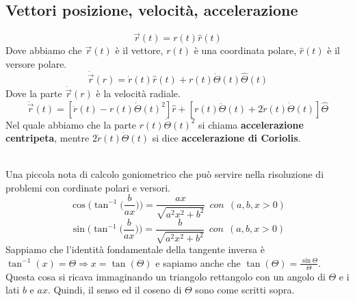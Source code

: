 \subsection*{Vettori posizione, velocità, accelerazione}
$$\vec{r}(t) = r(t)\hat{r}(t)$$
Dove abbiamo che $\vec{r}(t)$ è il vettore, $r(t)$ è una coordinata polare, $\hat{r}(t)$ è il versore polare.
$$\dot{\vec{r}}(r) = \dot{r}(t)\hat{r}(t) + r(t)\dot{\Theta}(t)\hat{\Theta}(t)$$
Dove la parte $\dot{\vec{r}}(r)$ è la velocità radiale.
$$\ddot{\vec{r}}(t) = [\ddot{r}(t) - r(t)\dot{\Theta}(t)^2] \hat{r} + [r(t) \ddot{\Theta}(t) + 2\dot{r}(t)\dot{\Theta}(t)]\hat{\Theta}$$
Nel quale abbiamo che la parte $r(t)\dot{\Theta}(t)^2$ si chiama \textbf{accelerazione centripeta}, mentre $2\dot{r}(t)\dot{\Theta}(t)$ si dice \textbf{accelerazione di Coriolis}.
\\\\
\begin{note}
    Una piccola nota di calcolo goniometrico che può servire nella risoluzione di problemi con cordinate polari e versori.
    $$
    \cos\Big(\tan^{-1}\Big(\frac{b}{ax}\Big)\Big) = \frac{ax}{\sqrt{a^2 x^2 + b^2}} \:\: con\:\: (a, b, x > 0)
    $$
    $$
    \sin\Big(\tan^{-1}\Big(\frac{b}{ax}\Big)\Big) = \frac{b}{\sqrt{a^2 x^2 + b^2}} \:\: con\:\: (a, b, x > 0)
    $$
    Sappiamo che l'identità fondamentale della tangente inversa è $\tan^{-1}(x) = \Theta \Rightarrow x = \tan(\Theta)$ e sapiamo anche che $\tan(\Theta) = \frac{\sin \Theta}{\Theta}$.
    Questa cosa si ricava immaginando un triangolo rettangolo con un angolo di $\Theta$ e i lati $b$ e $ax$. Quindi, il senso ed il coseno di $\Theta$ sono
    come scritti sopra.
\end{note}